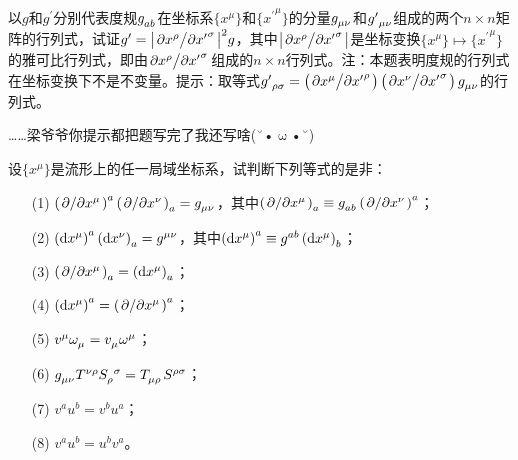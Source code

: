 \begin{xiti}
    \item 以$g$和$g^\prime$分别代表度规$\tensor{g}{_{ab}}$在坐标系$\{x^\mu\}$和$\{{x^\prime}^\mu\}$的分量$\tensor{g}{_{\mu\nu}}$和$\tensor{{g^\prime}}{_{\mu\nu}}$组成的两个$n\times n$矩阵的行列式，试证$g^\prime=\abs{\pdv*{x^\rho}{{x^\prime}^\sigma}}^2 g$，其中$\abs{\pdv*{x^\rho}{{x^\prime}^\sigma}}$是坐标变换$\{x^\mu\}\mapsto \{{x^\prime}^\mu \} $的雅可比行列式，即由$\pdv*{x^\rho}{{x^\prime}^\sigma} $组成的$n\times n$行列式。注：本题表明度规的行列式在坐标变换下不是不变量。提示：取等式$\tensor{{g^\prime}}{_{\rho\sigma}}=\left( \pdv*{x^\mu}{{x^\prime}^\rho}\right)\left(\pdv*{x^\nu}{{x^\prime}^\sigma} \right)\tensor{g}{_{\mu\nu}}  $的行列式。

    \begin{zm}
    	……梁爷爷你提示都把题写完了我还写啥(˘•$\upomega$•˘)
    \end{zm}

    \item 设$\{x^\mu \}$是流形上的任一局域坐标系，试判断下列等式的是非：
    \begin{enumerate}
    	\item[(1)] $\left(\pd{x^\mu} \right)^a\tensor{\left(\pd{x^\nu} \right)}{_a}=\tensor{g}{_\mu_\nu} $，其中$\tensor{\left(\pd{x^\mu} \right)}{_a} \equiv \tensor{g}{_a_b}\left(\pd{x^\nu} \right)^a $；
    	\item[(2)] $\left(\dd{x^\mu}\right)^a\tensor{\left(\dd{x^\nu}\right)}{_a}=\tensor{g}{^\mu^\nu} $，其中$\left(\dd{x^\mu}\right)^a\equiv \tensor{g}{^a^b}\tensor{\left(\dd{x^\mu} \right)}{_b} $；
    	\item[(3)] \hypertarget{2.23.3}{}$\tensor{\left(\pd{x^\mu}\right)}{_a}=\tensor{\left(\dd{x^\mu} \right)}{_a} $；
    	\item[(4)] $\left(\dd{x^\mu} \right)^a=\tensor{{\left(\pd{x^\mu} \right)}}{^a} $；
    	\item[(5)] $v^\mu\tensor{\omega}{_\mu}=\tensor{v}{_\mu}\omega^\mu $；
    	\item[(6)] $\tensor{g}{_\mu_\nu}\tensor{T}{^\nu^\rho}\tensor{S}{_\rho^\sigma}=\tensor{T}{_\mu_\rho}\tensor{S}{^\rho^\sigma} $；
    	\item[(7)] $v^au^b=v^bu^a$；
    	\item[(8)] $v^au^b=u^bv^a$。
    \end{enumerate}


\end{xiti}
